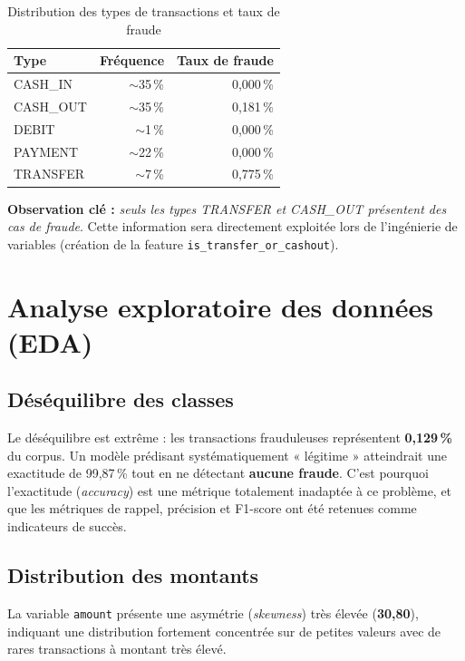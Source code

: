 \begin{table}[H]
\centering
\caption{Distribution des types de transactions et taux de fraude}
\label{tab:types_transactions}
\begin{tabular}{lrr}
\toprule
\textbf{Type} & \textbf{Fréquence} & \textbf{Taux de fraude} \\
\midrule
CASH\_IN   & $\sim$35\,\% & 0,000\,\% \\
CASH\_OUT  & $\sim$35\,\% & 0,181\,\% \\
DEBIT      & $\sim$1\,\%  & 0,000\,\% \\
PAYMENT    & $\sim$22\,\% & 0,000\,\% \\
TRANSFER   & $\sim$7\,\%  & 0,775\,\% \\
\bottomrule
\end{tabular}
\end{table}

\textbf{Observation clé :} \textit{seuls les types TRANSFER et CASH\_OUT présentent des cas
de fraude}. Cette information sera directement exploitée lors de l'ingénierie de variables
(création de la feature \texttt{is\_transfer\_or\_cashout}).

\section{Analyse exploratoire des données (EDA)}

\subsection{Déséquilibre des classes}

Le déséquilibre est extrême : les transactions frauduleuses représentent \textbf{0,129\,\%}
du corpus. Un modèle prédisant systématiquement « légitime » atteindrait une exactitude de
99,87\,\% tout en ne détectant \textbf{aucune fraude}. C'est pourquoi l'exactitude
(\textit{accuracy}) est une métrique totalement inadaptée à ce problème, et que les
métriques de rappel, précision et F1-score ont été retenues comme indicateurs de succès.

\subsection{Distribution des montants}

La variable \texttt{amount} présente une asymétrie (\textit{skewness}) très élevée
(\textbf{30,80}), indiquant une distribution fortement concentrée sur de petites valeurs
avec de rares transactions à montant très élevé.

